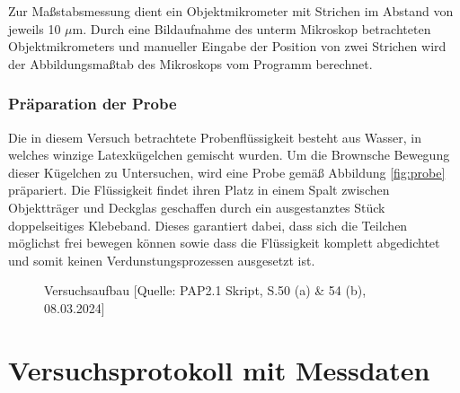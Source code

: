 \documentclass{article}
\begin{document}
Zur Maßstabsmessung dient ein Objektmikrometer mit Strichen im Abstand von jeweils 10 $\mu$m. Durch eine Bildaufnahme des unterm Mikroskop betrachteten Objektmikrometers und manueller Eingabe der Position von zwei Strichen wird der Abbildungsmaßtab des Mikroskops vom Programm berechnet.

\subsubsection{Präparation der Probe}

Die in diesem Versuch betrachtete Probenflüssigkeit besteht aus Wasser, in welches winzige Latexkügelchen gemischt wurden. Um die Brownsche Bewegung dieser Kügelchen zu Untersuchen, wird eine Probe gemäß Abbildung \ref{fig:probe} präpariert. Die Flüssigkeit findet ihren Platz in einem Spalt zwischen Objektträger und Deckglas geschaffen durch ein ausgestanztes Stück doppelseitiges Klebeband. Dieses garantiert dabei, dass sich die Teilchen möglichst frei bewegen können sowie dass die Flüssigkeit komplett abgedichtet und somit keinen Verdunstungsprozessen ausgesetzt ist. 

\begin{figure}[h]
  \centering
  \hfill
  \hfill
  \caption{Versuchsaufbau [Quelle: PAP2.1 Skript, S.50 (a) \& 54 (b), 08.03.2024]}
  \label{fig:Aufbau}
\end{figure}


\newpage

\section{Versuchsprotokoll mit Messdaten}
\end{document}
